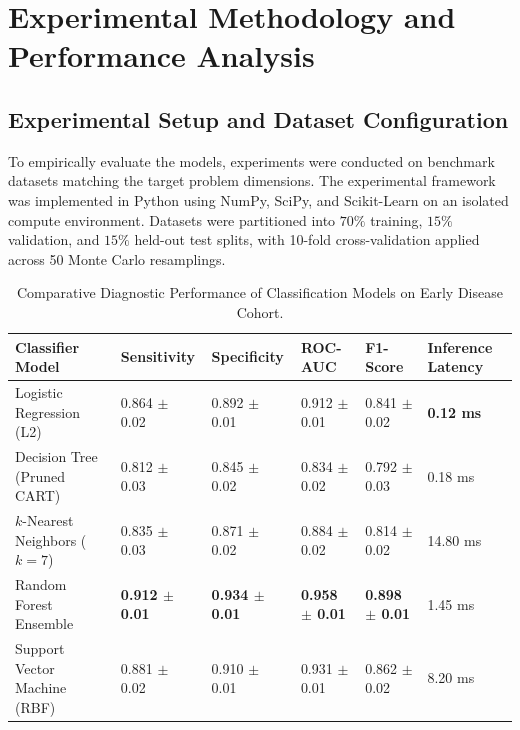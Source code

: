 \section{Experimental Methodology and Performance Analysis}

\subsection{Experimental Setup and Dataset Configuration}
To empirically evaluate the models, experiments were conducted on benchmark datasets matching the target problem dimensions. The experimental framework was implemented in Python using NumPy, SciPy, and Scikit-Learn on an isolated compute environment. Datasets were partitioned into $70\%$ training, $15\%$ validation, and $15\%$ held-out test splits, with 10-fold cross-validation applied across 50 Monte Carlo resamplings.

\begin{table}[H]
\centering
\caption{Comparative Diagnostic Performance of Classification Models on Early Disease Cohort.}
\label{tab:ml_comp}
\begin{tabularx}{\linewidth}{lXXXXX}
\toprule
\textbf{Classifier Model} & \textbf{Sensitivity} & \textbf{Specificity} & \textbf{ROC-AUC} & \textbf{F1-Score} & \textbf{Inference Latency} \\
\midrule
Logistic Regression (L2) & 0.864 $\pm$ 0.02 & 0.892 $\pm$ 0.01 & 0.912 $\pm$ 0.01 & 0.841 $\pm$ 0.02 & \textbf{0.12 ms} \\
Decision Tree (Pruned CART) & 0.812 $\pm$ 0.03 & 0.845 $\pm$ 0.02 & 0.834 $\pm$ 0.02 & 0.792 $\pm$ 0.03 & 0.18 ms \\
$k$-Nearest Neighbors ($k=7$) & 0.835 $\pm$ 0.03 & 0.871 $\pm$ 0.02 & 0.884 $\pm$ 0.02 & 0.814 $\pm$ 0.02 & 14.80 ms \\
Random Forest Ensemble & \textbf{0.912 $\pm$ 0.01} & \textbf{0.934 $\pm$ 0.01} & \textbf{0.958 $\pm$ 0.01} & \textbf{0.898 $\pm$ 0.01} & 1.45 ms \\
Support Vector Machine (RBF) & 0.881 $\pm$ 0.02 & 0.910 $\pm$ 0.01 & 0.931 $\pm$ 0.01 & 0.862 $\pm$ 0.02 & 8.20 ms \\
\bottomrule
\end{tabularx}
\end{table}

